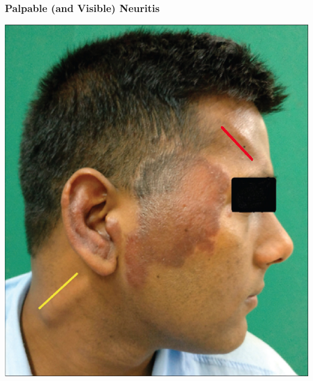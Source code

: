 \documentclass{beamer}
\begin{document}
	\begin{frame}
		\frametitle{Palpable (and Visible) Neuritis}
		\centering
		\includegraphics[height=0.8\textheight,keepaspectratio]{great-auricular-supraorbital.jpg}
	\end{frame}
\end{document}
